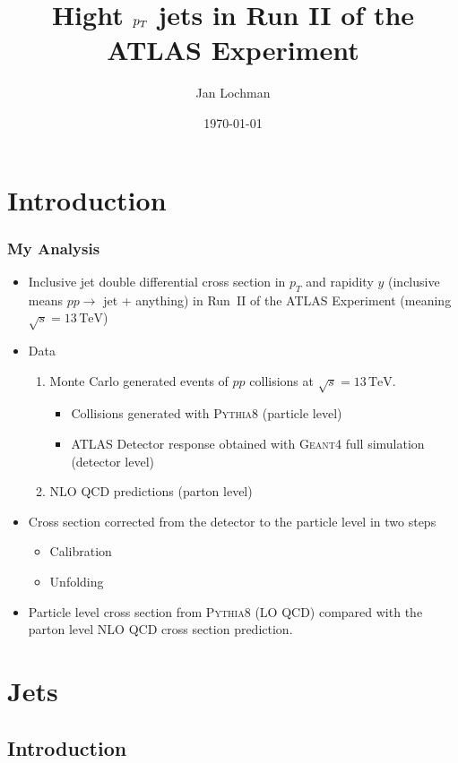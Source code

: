 \documentclass[compress]{beamer}
\title[High $\pt$ jets]{Hight $\pt$ jets in Run II of the ATLAS Experiment}
\author{Jan Lochman}
\institute[FNSPE CTU] 
{
Czech Technical University \\ 
\medskip
\textit{jan.lochman@cern.ch} \\
\medskip
\medskip
ATLAS Meeting \\ 
\medskip
}
\date{\today}
\newcommand{\TeV}{\,\text{TeV}}
\newcommand{\pt}{p_{T}}
\begin{document}
\section{Introduction}


\begin{frame}
\titlepage 
\end{frame}


\begin{frame}
\frametitle{My Analysis} 
\begin{itemize}
  \item Inclusive jet double differential cross section in $\pt$ and rapidity
    $y$ (inclusive means $pp \rightarrow$ jet + anything) in Run~II of the ATLAS
    Experiment (meaning $\sqrt{s}=13\TeV$)
  \item Data 
    \begin{enumerate}
      \item Monte Carlo  generated events of $pp$ collisions at
        $\sqrt{s}=13\TeV$. 
      \begin{itemize}
        \item Collisions generated with \textsc{Pythia8} (particle level)
        \item ATLAS Detector response obtained with \textsc{Geant4} full
          simulation (detector level)
      \end{itemize}
      \item NLO QCD predictions (parton level)
    \end{enumerate}
  \item Cross section corrected from the detector to the particle level in two
    steps
    \begin{itemize}
      \item Calibration
      \item Unfolding
    \end{itemize}
  \item Particle level cross section from \textsc{Pythia8} (LO QCD) compared
    with the parton level NLO QCD cross section prediction.
\end{itemize}
\end{frame}

\section{Jets}
\subsection{Introduction}
\end{document}
